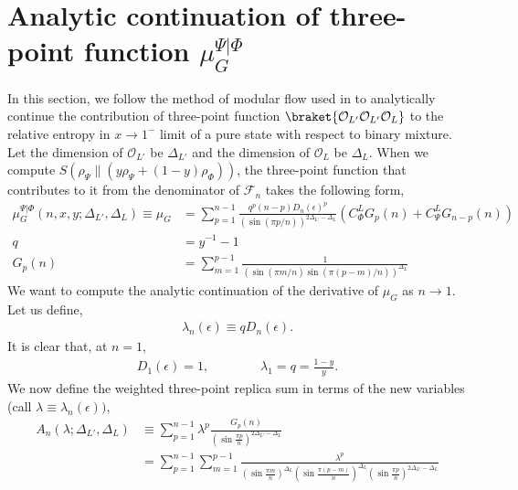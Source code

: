 \documentclass[11pt]{article}
\newcommand{\ep}{\epsilon}
\newcommand{\mO}{\mathcal{O}}
\newcommand{\lb}{\left(}
\newcommand{\rb}{\right)}
\begin{document}
\section{\texorpdfstring{Analytic continuation of three-point function $\mu_G^{\Psi|\Phi}$}{Analytic continuation of three-point function mu large interval}}\label{Appendix: analytic continuation of muG three point mixture}
In this section, we follow the method of modular flow used in \cite{S_rosi_2018} to analytically continue the contribution of three-point function $\braket{\mO_{L'}\mO_{L'}\mO_L}$ to the relative entropy in $x\to 1^-$ limit of a pure state with respect to binary mixture. Let the dimension of $\mO_{L'}$ be $\Delta_{L'}$ and the dimension of $\mO_L$ be $\Delta_L$. When we compute $S(\rho_\Psi \| \lb y\rho_\Psi + (1-y)\rho_\Phi\rb)$, the three-point function that contributes to it from the denominator of $\mathcal{F}_n$ takes the following form,
\begin{align}\label{eq: definition of muG q and Gp(n)}
    \mu_G^{\Psi|\Phi} (n,x,y;\Delta_{L'},\Delta_L) \equiv \mu_G &= \sum_{p=1}^{n-1}   \frac{q^p (n-p)D_n(\ep)^{p}}{\lb \sin(\pi p/n)\rb^{2\Delta_{L'}-\Delta_L}} \lb C_\Phi^L G_p(n) + C_\Psi^L G_{n-p}(n)\rb \\
    q &= y^{-1}-1 \\
    G_p(n) &= \sum_{m=1}^{p-1} \frac{1}{\lb \sin(\pi m/n) \sin(\pi (p-m)/n)\rb^{\Delta_L}}
\end{align}
We want to compute the analytic continuation of the derivative of $\mu_G$ as $n\to 1$. Let us define,
\begin{align}
    \lambda_n(\ep) \equiv  qD_n(\ep).
\end{align}
It is clear that, at $n=1$, 
\begin{align}
    D_1(\ep) = 1, \qquad\qquad \lambda_1 = q = \frac{1-y}{y}.
\end{align}
We now define the weighted three-point replica sum in terms of the new variables (call $\lambda \equiv \lambda_n(\ep))$,
\begin{align}
    A_n(\lambda;\Delta_{L'},\Delta_L) &\equiv \sum_{p=1}^{n-1}\lambda^p \frac{G_p(n)}{\lb\sin \frac{\pi p}{n}\rb^{2\Delta_{L'}-\Delta_L}}\\
    &= \sum_{p=1}^{n-1}\sum_{m=1}^{p-1}\frac{\lambda^p}{\lb\sin \frac{\pi m}{n}\rb^{\Delta_L} \lb\sin \frac{\pi (p-m)}{n}\rb^{\Delta_L} \lb\sin \frac{\pi p}{n}\rb^{2\Delta_{L'}-\Delta_L}}
\end{align}
\end{document}
